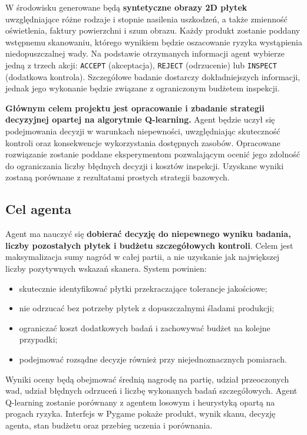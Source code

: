 \documentclass[12pt]{article}
\begin{document}
W środowisku generowane będą \textbf{syntetyczne obrazy 2D płytek} uwzględniające różne rodzaje i stopnie nasilenia uszkodzeń, a także zmienność oświetlenia, faktury powierzchni i szum obrazu. Każdy produkt zostanie poddany wstępnemu skanowaniu, którego wynikiem będzie oszacowanie ryzyka wystąpienia niedopuszczalnej wady. Na podstawie otrzymanych informacji agent wybierze jedną z trzech akcji: \texttt{ACCEPT} (akceptacja), \texttt{REJECT} (odrzucenie) lub \texttt{INSPECT} (dodatkowa kontrola). Szczegółowe badanie dostarczy dokładniejszych informacji, jednak jego wykonanie będzie związane z ograniczonym budżetem inspekcji.

\textbf{Głównym celem projektu jest opracowanie i zbadanie strategii decyzyjnej opartej na algorytmie Q-learning.} Agent będzie uczył się podejmowania decyzji w warunkach niepewności, uwzględniając skuteczność kontroli oraz konsekwencje wykorzystania dostępnych zasobów. Opracowane rozwiązanie zostanie poddane eksperymentom pozwalającym ocenić jego zdolność do ograniczania liczby błędnych decyzji i kosztów inspekcji. Uzyskane wyniki zostaną porównane z rezultatami prostych strategii bazowych.

\subsection{Cel agenta}

Agent ma nauczyć się \textbf{dobierać decyzję do niepewnego wyniku badania, liczby pozostałych płytek i budżetu szczegółowych kontroli}. Celem jest maksymalizacja sumy nagród w całej partii, a nie uzyskanie jak największej liczby pozytywnych wskazań skanera. System powinien:
\begin{itemize}[nosep]
    \item skutecznie identyfikować płytki przekraczające tolerancje jakościowe;
    \item nie odrzucać bez potrzeby płytek z dopuszczalnymi śladami produkcji;
    \item ograniczać koszt dodatkowych badań i zachowywać budżet na kolejne przypadki;
    \item podejmować rozsądne decyzje również przy niejednoznacznych pomiarach.
\end{itemize}

Wyniki oceny będą obejmować średnią nagrodę na partię, udział przeoczonych wad, udział błędnych odrzuceń i liczbę wykonanych badań szczegółowych. Agent Q-learning zostanie porównany z agentem losowym i heurystyką opartą na progach ryzyka. Interfejs w Pygame pokaże produkt, wynik skanu, decyzję agenta, stan budżetu oraz przebieg uczenia i porównania.
\end{document}
